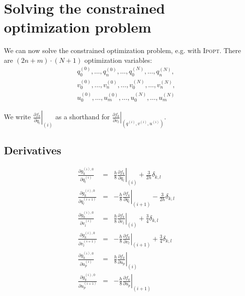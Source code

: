 \documentclass[a4paper]{article}
\begin{document}
\section{Solving the constrained optimization problem}
We can now solve the constrained optimization problem, e.g. with \textsc{Ipopt}. There are $(2n + m)\cdot (N+1)$ optimization variables:
\begin{eqnarray*}
q_0^{(0)}, \ldots, q_n^{(0)}, \ldots, q_0^{(N)}, \ldots, q_n^{(N)},\\
v_0^{(0)}, \ldots, v_n^{(0)}, \ldots, v_0^{(N)}, \ldots, v_n^{(N)},\\
u_0^{(0)}, \ldots, u_m^{(0)}, \ldots, u_0^{(N)}, \ldots, u_m^{(N)}
\end{eqnarray*}

We write $\left. \frac{\partial f_k}{\partial q_l} \right|_{(i)}$ as a shorthand for $\left. \frac{\partial f_k}{\partial v_l} \right|_{(q^{(i)}, v^{(i)}, u^{(i)})}$.

\subsection{Derivatives}
\begin{eqnarray}
\frac{\partial g_k^{(i),0}}{\partial q_l^{(i)}} 
&=& \left. \frac{h}{8} \frac{\partial f_k}{\partial q_l} \right|_{(i)}
 + \frac{3}{2h} \delta_{k,l}\\
\frac{\partial g_k^{(i),0}}{\partial q_l^{(i+1)}} 
&=& -\left. \frac{h}{8} \frac{\partial f_k}{\partial q_l} \right|_{(i+1)}
 - \frac{3}{2h} \delta_{k,l}\\
\frac{\partial g_k^{(i),0}}{\partial v_l^{(i)}} 
&=& \left. \frac{h}{8} \frac{\partial f_k}{\partial v_l} \right|_{(i)}
 + \frac{3}{4} \delta_{k,l}\\
\frac{\partial g_k^{(i),0}}{\partial v_l^{(i+1)}} 
&=& -\left. \frac{h}{8} \frac{\partial f_k}{\partial v_l} \right|_{(i+1)}
 + \frac{3}{4} \delta_{k,l}\\
 \frac{\partial g_k^{(i),0}}{\partial u_p^{(i)}} 
&=& \left. \frac{h}{8} \frac{\partial f_k}{\partial u_p} \right|_{(i)}\\
 \frac{\partial g_k^{(i),0}}{\partial u_p^{(i+1)}} 
&=& -\left. \frac{h}{8} \frac{\partial f_k}{\partial u_p} \right|_{(i+1)}
\end{eqnarray}
\end{document}
